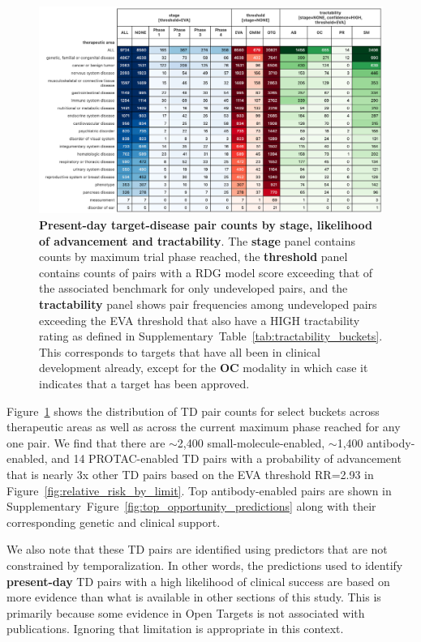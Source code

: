 \documentclass{article}
\begin{document}
\begin{figure}[!htb]
  \centering
  \captionsetup{width=.9\linewidth}
  \includegraphics[width=1\textwidth]{opportunity_summary.png}
  \caption{
    \textbf{Present-day target-disease pair counts by stage, likelihood of advancement and tractability}. The \textbf{stage} panel contains counts by maximum trial phase reached, the \textbf{threshold} panel contains counts of pairs with a RDG model score exceeding that of the associated benchmark for only undeveloped pairs, and the \textbf{tractability} panel shows pair frequencies among undeveloped pairs exceeding the EVA threshold that also have a HIGH tractability rating as defined in Supplementary~Table~\ref{tab:tractability_buckets}. This corresponds to targets that have all been in clinical development already, except for the \textbf{OC} modality in which case it indicates that a target has been approved. 
  }
  \label{fig:opportunity_summary}
\end{figure}

Figure~\ref{fig:opportunity_summary} shows the distribution of TD pair counts for select buckets across therapeutic areas as well as across the current maximum phase reached for any one pair. We find that there are $\sim$2,400 small-molecule-enabled, $\sim$1,400 antibody-enabled, and 14 PROTAC-enabled TD pairs with a probability of advancement that is nearly 3x other TD pairs based on the EVA threshold RR=2.93 in Figure~\ref{fig:relative_risk_by_limit}. Top antibody-enabled pairs are shown in Supplementary~Figure~\ref{fig:top_opportunity_predictions} along with their corresponding genetic and clinical support.

We also note that these TD pairs are identified using predictors that are not constrained by temporalization. In other words, the predictions used to identify \textbf{present-day} TD pairs with a high likelihood of clinical success are based on more evidence than what is available in other sections of this study. This is primarily because some evidence in Open Targets is not associated with publications. Ignoring that limitation is appropriate in this context.
\end{document}
